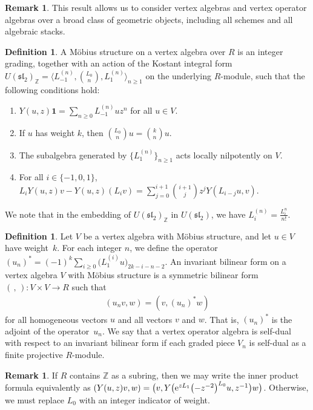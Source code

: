 \documentclass[pdftex]{sigma}
\newcommand{\bZ}{\mathbb{Z}}
\newcommand{\unit}{\mathbf{1}}
\newcommand{\fsl}{\mathfrak{sl}}
\theoremstyle{definition}
\newtheorem{defn}[thm]{Definition}
\newtheorem{rem}[thm]{Remark}
\begin{document}
\begin{rem}This result allows us to consider vertex algebras and vertex operator algebras over a broad class of geometric objects, including all schemes and all algebraic stacks.
\end{rem}

\begin{defn}A M\"obius structure on a vertex algebra over $R$ is an integer grading, together with an action of the Kostant integral form $U(\fsl_2)_{\bZ} = \big\langle L_{-1}^{(n)}, \binom{L_0}{n}, L_1^{(n)} \big\rangle_{n \geq 1}$ on the underlying $R$-module, such that the following conditions hold:
\begin{enumerate}\itemsep=0pt
\item $Y(u,z)\unit = \sum\limits_{n \geq 0} L_{-1}^{(n)}u z^n$ for all $u \in V$.
\item If $u$ has weight $k$, then $\binom{L_0}{n}u = \binom{k}{n}u$.
\item The subalgebra generated by $\{ L_1^{(n)} \}_{n \geq 1}$ acts locally nilpotently on $V$.
\item For all $i \in \{-1,0,1\}$, $L_i Y(u,z)v - Y(u,z)(L_i v) = \sum\limits_{j =0}^{i+1} \binom{i+1}{j} z^j Y(L_{i-j} u,v)$.
\end{enumerate}
We note that in the embedding of $U(\fsl_2)_{\bZ}$ in $U(\fsl_2)$, we have $L_i^{(n)} = \frac{L_i^n}{n!}$.
\end{defn}

\begin{defn}Let $V$ be a vertex algebra with M\"obius structure, and let $u \in V$ have weight~$k$. For each integer $n$, we define the operator $(u_n)^* = (-1)^k \sum\limits_{i \geq 0} \big(L_1^{(i)} u\big)_{2k-i-n-2}$. An invariant bilinear form on a vertex algebra $V$ with M\"obius structure is a symmetric bilinear form $(\,,\,)\colon V \times V \to R$ such that
\begin{gather*} (u_n v,w) = (v, (u_n)^* w) \end{gather*}
for all homogeneous vectors $u$ and all vectors $v$ and $w$. That is, $(u_n)^*$ is the adjoint of the operator~$u_n$. We say that a vertex operator algebra is self-dual with respect to an invariant bilinear form if each graded piece $V_n$ is self-dual as a finite projective $R$-module.
\end{defn}

\begin{rem}If $R$ contains $\bZ$ as a subring, then we may write the inner product formula equivalently as $(Y(u,z)v,w) = \big(v, Y\big({\rm e}^{zL_1}\big({-}z^{-2}\big)^{L_0}u, z^{-1}\big)w\big)$. Otherwise, we must replace $L_0$ with an integer indicator of weight.
\end{rem}
\end{document}
